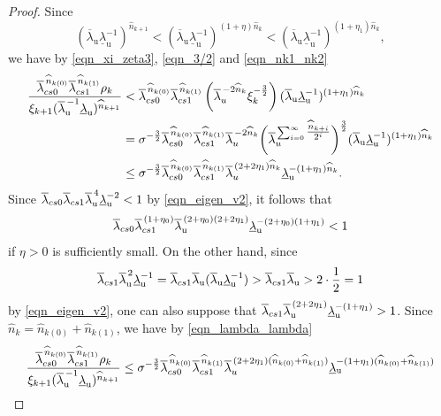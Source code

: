 \documentclass[10pt,a4paper]{amsart}
\def\ol{\overline}
\def\ru{{\mathrm{u}}}
\def\ul{\underline}
\def\wh{\widehat}
\begin{document}
\begin{proof}
Since 
\[
(\ol\lambda_{\ru}\ul\lambda_{\ru}^{-1})^{\wh n_{k+1}}
<(\ol\lambda_{\ru}\ul\lambda_{\ru}^{-1})^{(1+\eta)\wh n_{k}}
<(\ol\lambda_{\ru}\ul\lambda_{\ru}^{-1})^{(1+\eta_1)\wh n_{k}},
\]
we have 
by \eqref{eqn_xi_zeta3}, \eqref{eqn_3/2} and \eqref{eqn_nk1_nk2} 
\begin{align}\label{eqn_lambda_lambda}
\frac{ \ol\lambda_{\rm cs0}^{\,\widehat n_{k(0)}}\ol\lambda_{\rm cs1}^{\,\widehat n_{k(1)}}\rho_{k}}{\xi_{k+1}(\ol\lambda_{\ru}^{\,-1}\ul\lambda_{\ru})^{\wh n_{k+1}}}
&<\ol\lambda_{\rm cs0}^{\,\widehat n_{k(0)}}\ol\lambda_{\rm cs1}^{\,\widehat n_{k(1)}} \left(\ol{\lambda}_{\rm u}^{\,-2\wh n_k}\xi_k^{-\frac32}\right)(\ol\lambda_{\ru}\ul\lambda_{\ru}^{-1})^{(1+\eta_1)\wh n_k}\nonumber\\
&=
\sigma^{-\frac{3}{2}} \ol\lambda_{\rm cs0}^{\,\widehat n_{k(0)}}\ol\lambda_{\rm cs1}^{\,\widehat n_{k(1)}} \ol{\lambda}_{\rm u}^{\,-2 \widehat n_{k}}
\biggl(\ol{\lambda}_{\rm u}^
{\,\sum_{i=0}^{\infty}\tfrac{\widehat n_{k+i}}{2^{i}}}
\biggr)^{\frac{3}{2}}(\ol\lambda_{\ru}\ul\lambda_{\ru}^{-1})^{(1+\eta_1)\wh n_k}\nonumber\\
&\leq \sigma^{-\frac{3}{2}} \ol\lambda_{\rm cs0}^{\,\widehat n_{k(0)}}\ol\lambda_{\rm cs1}^{\,\widehat n_{k(1)}} \ol{\lambda}_{\rm u}^{\,(2+2\eta_1)\widehat n_{k}}\ul\lambda_{\ru}^{-(1+\eta_1)\wh n_k}.
\end{align}
Since 
$\ol\lambda_{\rm cs0}\ol\lambda_{\rm cs1}\ol\lambda_{\ru}^{\,4}\ul\lambda_{\ru}^{-2}<1$ 
by \eqref{eqn_eigen_v2}, it follows that  
\[
\ol\lambda_{\rm cs0}\ol\lambda_{\rm cs1}^{\,(1+\eta_0)}\ol\lambda_{\mathrm{u}}^{\,(2+\eta_0)(2+2\eta_{1})}\ul\lambda_{\ru}^{-(2+\eta_0)(1+\eta_1)}<1
\]
if $\eta>0$ is sufficiently small.
On the other hand, since 
\[
\ol\lambda_{\rm cs1}\ol\lambda_{\mathrm{u}}^{\,2}\ul\lambda_{\ru}^{-1}
=\ol\lambda_{\rm cs1}\ol\lambda_{\mathrm{u}}(\ol\lambda_{\mathrm{u}}\ul\lambda_{\ru}^{-1})>\ol\lambda_{\rm cs1}\ol\lambda_{\mathrm{u}}>2\cdot\frac12=1
\]
by \eqref{eqn_eigen_v2}, 
one can also suppose that 
$
\ol\lambda_{\rm cs1}\ol\lambda_{\mathrm{u}}^{\,(2+2\eta_{1})}\ul\lambda_{\ru}^{-(1+\eta_1)}>1$.
Since $\wh n_k=\wh n_{k(0)}+\wh n_{k(1)}$, we have by \eqref{eqn_lambda_lambda} 
\begin{align*}
\frac{\ol\lambda_{\rm cs0}^{\,\widehat n_{k(0)}}\ol\lambda_{\rm cs1}^{\,\widehat n_{k(1)}}\rho_{k}}{\xi_{k+1}(\ol\lambda_{\ru}^{\,-1}\ul\lambda_{\ru})^{\wh n_{k+1}}}
&
\leq \sigma^{-\frac{3}{2}} \ol\lambda_{\rm cs0}^{\,\widehat n_{k(0)}}\ol\lambda_{\rm cs1}^{\,\widehat n_{k(1)}} \ol{\lambda}_{\rm u}^{\,(2+2\eta_1)(\widehat n_{k(0)}+\widehat n_{k(1)})}\ul\lambda_{\ru}^{-(1+\eta_1)(\widehat n_{k(0)}+\widehat n_{k(1)})}\\

\end{align*}
\end{proof}
\end{document}
